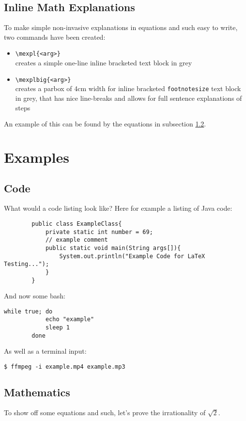 \documentclass{article}
\begin{document}
    \subsection{Inline Math Explanations}
    To make simple non-invasive explanations in equations and such easy to write, two 
    commands have been created: 
    \begin{itemize}
        \item \texttt{\textbackslash mexpl\{<arg>\}} \\
            creates a simple one-line inline bracketed text block in grey
        \item \texttt{\textbackslash mexplbig\{<arg>\}} \\
            creates a parbox of 4cm width for inline bracketed 
            \texttt{footnotesize} text block in grey, that 
            has nice line-breaks and allows for full sentence explanations of steps 
    \end{itemize}
    An example of this can be found by the equations in subsection \ref{subsec:maths}. 


\section{Examples}
    \subsection{Code}
    What would a code listing look like? Here for example a listing of Java code: 
    \begin{lstlisting}
        public class ExampleClass{
            private static int number = 69; 
            // example comment 
            public static void main(String args[]){
                System.out.println("Example Code for LaTeX Testing...");
            }
        }
    \end{lstlisting}

    And now some bash: 
    \begin{lstlisting}[style=bash]
		while true; do
			echo "example" 
			sleep 1
		done
    \end{lstlisting}
    As well as a terminal input: 
    \begin{lstlisting}[style=terminal]
        $ ffmpeg -i example.mp4 example.mp3
    \end{lstlisting}

    \subsection{Mathematics}\label{subsec:maths}
    To show off some equations and such, let's prove the irrationality of $\sqrt{2}$. 
\end{document}
